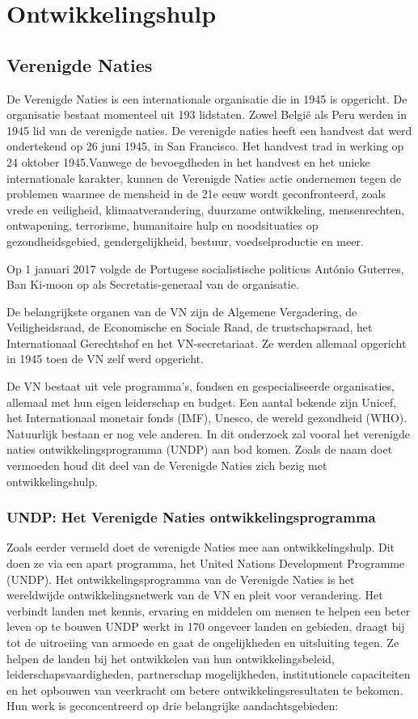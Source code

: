 \section{Ontwikkelingshulp}

\subsection{Verenigde Naties}
De Verenigde Naties is een internationale organisatie die in 1945 is opgericht. De organisatie bestaat momenteel uit 193 lidstaten. Zowel België als Peru werden in 1945 lid van de verenigde naties. De verenigde naties heeft een handvest dat werd ondertekend op 26 juni 1945, in San Francisco. Het handvest trad in werking op 24 oktober 1945.Vanwege de bevoegdheden in het handvest en het unieke internationale karakter, kunnen de Verenigde Naties actie ondernemen tegen de problemen waarmee de mensheid in de 21e eeuw wordt geconfronteerd, zoals vrede en veiligheid, klimaatverandering, duurzame ontwikkeling, mensenrechten, ontwapening, terrorisme, humanitaire hulp en noodsituaties op gezondheidsgebied, gendergelijkheid, bestuur, voedselproductie en meer. \autocite{Nations2020}

Op 1 januari 2017 volgde de Portugese socialistische politicus António Guterres, Ban Ki-moon op als Secretatis-generaal van de organisatie. 

De belangrijkste organen van de VN zijn de Algemene Vergadering, de Veiligheidsraad, de Economische en Sociale Raad, de trustschapsraad, het Internationaal Gerechtshof en het VN-secretariaat. Ze werden allemaal opgericht in 1945 toen de VN zelf werd opgericht. 

De VN bestaat uit vele programma's, fondsen en gespecialiseerde organisaties, allemaal met hun eigen leiderschap en budget. Een aantal bekende zijn Unicef, het Internationaal monetair fonds (IMF), Unesco, de wereld gezondheid (WHO). Natuurlijk bestaan er nog vele anderen. In dit onderzoek zal vooral het verenigde naties ontwikkelingsprogramma (UNDP) aan bod komen. Zoals de naam doet vermoeden houd dit deel van de Verenigde Naties zich bezig met ontwikkelingshulp.

\subsubsection{UNDP: Het Verenigde Naties ontwikkelingsprogramma}
Zoals eerder vermeld doet de verenigde Naties mee aan ontwikkelingshulp. Dit doen ze via een apart programma, het United Nations Development Programme (UNDP). Het ontwikkelingsprogramma van de Verenigde Naties is het wereldwijde ontwikkelingsnetwerk van de VN en pleit voor verandering. Het verbindt landen met kennis, ervaring en middelen om mensen te helpen een beter leven op te bouwen UNDP werkt in 170 ongeveer landen en gebieden, draagt bij tot de uitroeiing van armoede en gaat de ongelijkheden en uitsluiting tegen. Ze helpen de landen bij het ontwikkelen van hun ontwikkelingsbeleid, leiderschapsvaardigheden, partnerschap mogelijkheden, institutionele capaciteiten en het opbouwen van veerkracht om betere ontwikkelingsresultaten te bekomen. \autocite{DevelopmentProgram2020}
Hun werk is geconcentreerd op drie belangrijke aandachtsgebieden:

